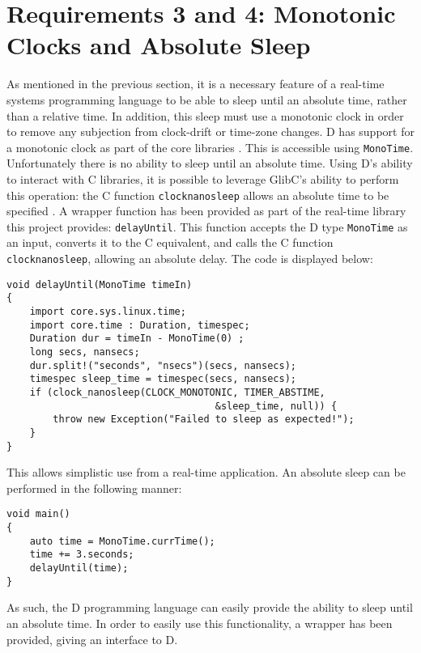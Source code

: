 \section{Requirements 3 and 4: Monotonic Clocks and Absolute Sleep}
As mentioned in the previous section, it is a necessary feature of a real-time 
systems programming language to be able to sleep until an absolute time, rather 
than a relative time. In addition, this sleep must use a monotonic clock in order 
to remove any subjection from clock-drift or time-zone changes. D has support 
for a monotonic clock as part of the core libraries 
\cite{dlang-core-time}. This is accessible using 
\texttt{MonoTime}. Unfortunately there is no ability to sleep until an 
absolute time. Using D's ability to interact with C libraries, it is possible 
to leverage GlibC's ability to perform this operation: the C function 
\texttt{clock\textunderscore{}nanosleep} allows an absolute time to be specified
\cite{clock-nanosleep}.
A wrapper function has been provided as part of the real-time library this 
project provides: \texttt{delayUntil}.
This function accepts the D type \texttt{MonoTime} as an input, converts it to the C 
equivalent, and calls the C function \texttt{clock\textunderscore{}nanosleep}, 
allowing an absolute delay. The code is displayed below: 
\begin{lstlisting}[basicstyle=\small]
void delayUntil(MonoTime timeIn)
{
    import core.sys.linux.time; 
    import core.time : Duration, timespec; 
    Duration dur = timeIn - MonoTime(0) ;
    long secs, nansecs; 
    dur.split!("seconds", "nsecs")(secs, nansecs); 
    timespec sleep_time = timespec(secs, nansecs); 
    if (clock_nanosleep(CLOCK_MONOTONIC, TIMER_ABSTIME, 
                                    &sleep_time, null)) {
        throw new Exception("Failed to sleep as expected!"); 
    }
}
\end{lstlisting}
This allows simplistic use from a real-time application. An absolute sleep can 
be performed in the following manner: 
\begin{lstlisting}[basicstyle=\small]
void main()
{
    auto time = MonoTime.currTime(); 
    time += 3.seconds; 
    delayUntil(time);
}
\end{lstlisting}
As such, the D programming language can easily provide the ability to sleep 
until an absolute time. In order to easily use this functionality, a 
wrapper has been provided, giving an interface to D.

